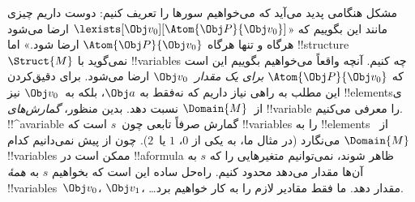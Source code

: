 \documentclass[../../../include/open-logic-section]{subfiles}
\begin{document}
مشکل هنگامی پدید می‌آید که می‌خواهیم سورها را تعریف کنیم: دوست داریم
چیزی مانند این بگوییم که «$\lexists[\Obj v_0][\Atom{\Obj P}{\Obj
v_0}]$ ارضا می‌شود هرگاه و تنها هرگاه $\Atom{\Obj P}{\Obj v_0}$ ارضا
شود.» اما !!{structure}~$\Struct{M}$ نمی‌گوید با !!{variable}s چه
کنیم. آنچه واقعاً می‌خواهیم بگوییم این است که
$\Atom{\Obj P}{\Obj v_0}$ \emph{برای یک مقدار~$\Obj v_0$} ارضا می‌شود.
برای دقیق‌کردن این مطلب به راهی نیاز داریم که نه‌فقط به $\Obj a$، بلکه
به~$\Obj v_0$ نیز !!{element}sی از~$\Domain{M}$ نسبت دهد. بدین منظور،
\emph{گمارش‌های} !!{variable} را معرفی می‌کنیم. !!^a{variable} گمارش
صرفاً تابعی چون~$s$ است که !!{variable}s را به !!{element}s
از~$\Domain{M}$ می‌نگارد (در مثال ما، به یکی از $0$، $1$ یا~$2$).
چون از پیش نمی‌دانیم کدام !!{variable}s ممکن است در !!a{formula} ظاهر
شوند، نمی‌توانیم متغیرهایی را که $s$ به آن‌ها مقدار می‌دهد محدود کنیم.
راه‌حل ساده این است که بخواهیم $s$ به \emph{همهٔ}
!!{variable}s~$\Obj v_0$، $\Obj v_1$، \dots\@ مقدار دهد. ما فقط
مقادیر لازم را به کار خواهیم برد.
\end{document}
